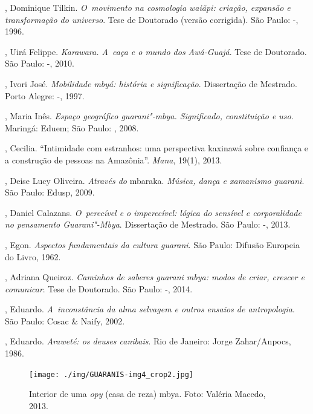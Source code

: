 \begin{Parskip}
, Dominique Tilkin. \emph{O~movimento na cosmologia waiãpi:
criação, expansão e transformação do universo}. Tese de Doutorado
(versão corrigida). São Paulo: -, 1996.

, Uirá Felippe. \emph{Karawara. A~caça e o mundo dos Awá-Guajá}.
Tese de Doutorado. São Paulo: -, 2010.

, Ivori José. \emph{Mobilidade mbyá: história e significação}.
Dissertação de Mestrado. Porto Alegre: -, 1997.

, Maria Inês. \emph{Espaço geográfico guarani"-mbya. Significado,
constituição e uso}. Maringá: Eduem; São Paulo: , 2008.

, Cecilia. ``Intimidade com estranhos: uma perspectiva
kaxinawá sobre confiança e a construção de pessoas na Amazônia''. \emph{Mana},
19(1), 2013.

, Deise Lucy Oliveira. \emph{Através do} mbaraka. \emph{Música, dança e
xamanismo guarani}. São Paulo: Edusp, 2009.

, Daniel Calazans. \emph{O~perecível e o imperecível: lógica do
sensível e corporalidade no pensamento Guarani"-Mbya}. Dissertação de
Mestrado. São Paulo: -, 2013.

, Egon. \emph{Aspectos fundamentais da cultura guarani}. São
Paulo: Difusão Europeia do Livro, 1962.

, Adriana Queiroz. \emph{Caminhos de saberes guarani mbya: modos de
criar, crescer e comunicar}. Tese de Doutorado. São Paulo: -,
2014.

, Eduardo. \emph{A~inconstância da alma selvagem e
outros ensaios de antropologia}. São Paulo: Cosac \& Naify, 2002.

, Eduardo. \emph{Araweté: os deuses canibais}. Rio de
Janeiro: Jorge Zahar/Anpocs, 1986.

\end{Parskip}

\pagebreak

\begin{absolutelynopagebreak}
\begin{vplace}
\begin{figure}[H]
\begin{adjustwidth}{-2.7cm}{} 
  \vspace{-3.1cm}
 \texttt{[image: ./img/GUARANIS-img4\_crop2.jpg]}	
\end{adjustwidth}
  \caption{Interior de uma \emph{opy} (casa de reza) mbya. Foto: Valéria Macedo, 2013.}
\end{figure}
\end{vplace}

\thispagestyle{empty}
\end{absolutelynopagebreak}

